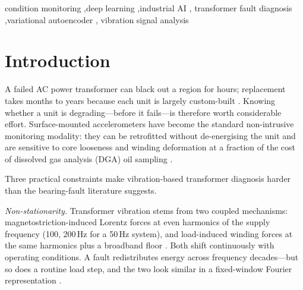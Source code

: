 \documentclass[preprint,12pt,3p]{elsarticle}
\let\cite\citep   %
\newcommand{\zerone}{\textsc{SpecRas}\xspace}      %
\newcommand{\hetspatvae}{\textsc{HetSpatVAE}\xspace} %
\newcommand{\hczv}{\hetspatvae}                    %
\begin{document}
\begin{frontmatter}
\begin{abstract}
On 400 held-out samples from two previously unseen transformers
(246 normal, 154 fault), \zerone achieves \textbf{97.00\% accuracy}
(macro-F1\,=\,0.969, AUC\,=\,0.989) with zero missed faults; \hczv
reaches \textbf{98.25\% accuracy} (macro-F1\,=\,0.982) with zero
missed faults and just 7 false positives.
All false positives cluster in the evening peak-load window with
elevated 1{,}000--2{,}000\,Hz STFT content, consistent with load as
a missing covariate.
\end{abstract}

\begin{keyword}
condition monitoring \sep deep learning \sep industrial AI \sep
transformer fault diagnosis \sep variational autoencoder \sep
vibration signal analysis
\end{keyword}

\end{frontmatter}

\section{Introduction}
\label{sec:intro}

A failed AC power transformer can black out a region for
hours; replacement takes months to years because each unit is largely
custom-built \cite{cigre2015TB642}.
Knowing whether a unit is degrading---before it fails---is therefore
worth considerable effort.
Surface-mounted accelerometers have become the standard non-intrusive
monitoring modality: they can be retrofitted without de-energising the
unit and are sensitive to core looseness and winding deformation at a
fraction of the cost of dissolved gas analysis (DGA) oil sampling
\cite{bagheri2018transformer,tenbohlen2016diagnostic}.

Three practical constraints make vibration-based transformer diagnosis
harder than the bear\-ing-fault literature suggests.

\textit{Non-stationarity.}
Transformer vibration stems from two coupled mechanisms:
magnet\-o\-stric\-tion-in\-duced Lorentz forces at even harmonics of the supply
frequency (100, 200\,Hz for a 50\,Hz system), and load-induced winding
forces at the same harmonics plus a broadband floor
\cite{zollanvari2021transformer}.
Both shift continuously with operating conditions.
A fault redistributes energy across frequency decades---but so does a
routine load step, and the two look similar in a fixed-window Fourier
representation \cite{hong2021transformer}.
\end{document}

